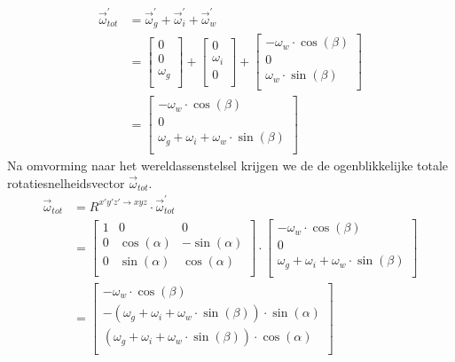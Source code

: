 \begin{equation}
\begin{split}
\vec{\omega}_{tot}^{'}&=\vec{\omega}_{g}^{'} + \vec{\omega}_{i}^{'} + \vec{\omega}_{w}^{'}\\
&=\begin{bmatrix}
0						\\
0						\\
\omega_{g}	\\
\end{bmatrix}
+\begin{bmatrix}
0						\\
\omega_{i}	\\
0						\\
\end{bmatrix}
+\begin{bmatrix}
-\omega_{w}\cdot \cos(\beta)	\\
0						\\
\omega_{w}\cdot \sin(\beta)	\\
\end{bmatrix}\\
&=\begin{bmatrix}
-\omega_{w}\cdot \cos(\beta)	\\
0						\\
\omega_{g}+\omega_{i}+\omega_{w}\cdot \sin(\beta)	\\
\end{bmatrix}
\end{split}
\label{eq:kin1.2}
\end{equation}
Na omvorming naar het wereldassenstelsel krijgen we de de ogenblikkelijke totale rotatiesnelheidsvector $\vec{\omega}_{tot}$.
\begin{equation}
\begin{split}
\vec{\omega}_{tot}&=R^{x'y'z' \rightarrow xyz} \cdot \vec{\omega}_{tot}^{'}\\
&=\begin{bmatrix}
1			&			0			&			0		   \\
0			&\cos(\alpha)&-\sin(\alpha)\\
0			&\sin(\alpha)&\cos(\alpha) \\
\end{bmatrix}
\cdot
\begin{bmatrix}
-\omega_{w}\cdot \cos(\beta)	\\
0						\\
\omega_{g}+\omega_{i}+\omega_{w}\cdot \sin(\beta)	\\
\end{bmatrix}\\
&=
\begin{bmatrix}
-\omega_{w}\cdot \cos(\beta)	\\
-(\omega_{g}+\omega_{i}+\omega_{w}\cdot \sin(\beta))	\cdot \sin(\alpha)			\\
(\omega_{g}+\omega_{i}+\omega_{w}\cdot \sin(\beta))	\cdot \cos(\alpha)	\\
\end{bmatrix}
\end{split}
\label{eq:kin1.3}
\end{equation}
